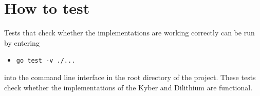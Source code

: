 \section{How to test}
Tests that check whether the implementations are working correctly can be run by entering
\begin{itemize}
  \item \texttt{go test -v ./...}
\end{itemize}
into the command line interface in the root directory of the project. These tests check whether the implementations of the Kyber and Dilithium are functional.
